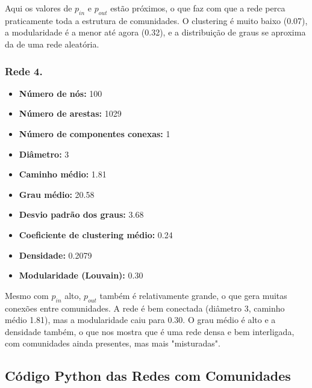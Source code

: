 \documentclass[a4paper]{article}
\begin{document}
Aqui os valores de \(p_{in}\) e \(p_{out}\) estão próximos, o que faz com que a rede perca praticamente toda a estrutura de comunidades. O clustering é muito baixo (0.07), a modularidade é a menor até agora (0.32), e a distribuição de graus se aproxima da de uma rede aleatória.

\subsubsection{Rede 4.}
\begin{itemize}
    \item \textbf{Número de nós:} 100
    \item \textbf{Número de arestas:} 1029
    \item \textbf{Número de componentes conexas:} 1
    \item \textbf{Diâmetro:} 3
    \item \textbf{Caminho médio:} 1.81
    \item \textbf{Grau médio:} 20.58
    \item \textbf{Desvio padrão dos graus:} 3.68
    \item \textbf{Coeficiente de clustering médio:} 0.24
    \item \textbf{Densidade:} 0.2079
    \item \textbf{Modularidade (Louvain):} 0.30
\end{itemize}

Mesmo com \(p_{in}\) alto, \(p_{out}\) também é relativamente grande, o que gera muitas conexões entre comunidades. A rede é bem conectada (diâmetro 3, caminho médio 1.81), mas a modularidade caiu para 0.30. O grau médio é alto e a densidade também, o que nos mostra que é uma rede densa e bem interligada, com comunidades ainda presentes, mas mais "misturadas".

\newpage

\subsection{Código Python das Redes com Comunidades}
\end{document}

